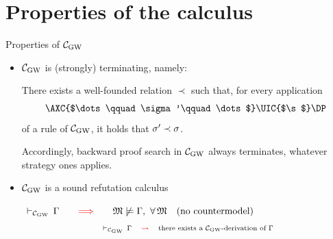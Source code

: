 \section{Properties of the calculus}

  
\begin{frame}{Properties of $\mathcal{C}_{\mathrm{GW}}$}
  \small




  
  \begin{itemize}
  \item[(1)] 
 $\mathcal{C}_{\mathrm{GW}}$ is    {\red (strongly) terminating}, namely:
  
\begin{center}
    \begin{tcolorbox}[colframe=blue!75!black]
\small
     
    There exists a {\red well-founded relation} $\prec$ such that, for every application
    \[
\AXC{$\dots\qquad \sigma'\qquad \dots$}
\UIC{$\s$}
\DP
\]
of a  rule of $\mathcal{C}_{\mathrm{GW}}$, it holds that $\sigma'\prec \sigma$.
\end{tcolorbox}
 
\end{center}
   
Accordingly, backward proof search in $\mathcal{C}_{\mathrm{GW}}$  always terminates,
  whatever strategy ones applies. 

\SP
\item[(2)] 
$\mathcal{C}_{\mathrm{GW}}$ is a   {\red  sound} refutation calculus


  \begin{center}
    \begin{tcolorbox}[colframe=blue!75!black,width=30em]
       \center
  $
{}\,\vdash_{\mathcal{C}_{\mathrm{GW}}}\, \Gamma
\qquad{\color{red}\Longrightarrow}\qquad
\mathfrak{M}\not\models \Gamma,\ \forall\, \mathfrak{M}
\quad\text{(no countermodel)}
$
\[\scriptsize
  \begin{array}{rcl}
    {}\,\vdash_{\mathcal{C}_{\mathrm{GW}}}\, \Gamma    & \color{red} \rightsquigarrow & \mbox{there exists a $\mathcal{C}_{\mathrm{GW}}$-derivation of $\Gamma$}
    \end{array}
\]
 \end{tcolorbox}
\end{center}


\end{itemize}

  \VFILL
\end{frame}


